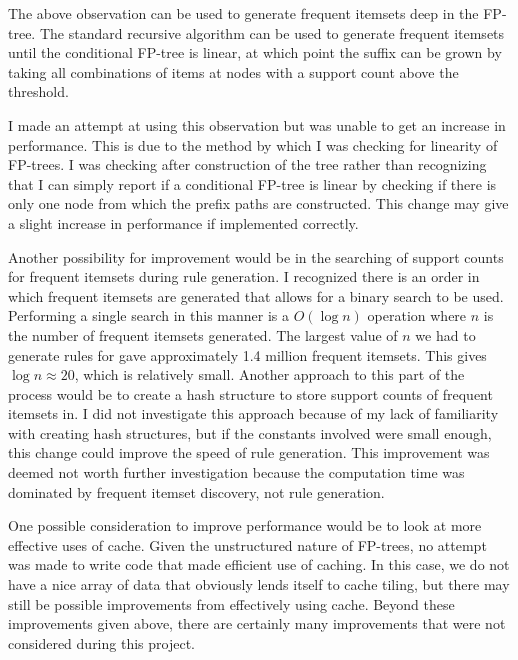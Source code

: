 \documentclass[11pt]{article}
\begin{document}
The above observation can be used to generate frequent itemsets deep in the FP-tree. The standard recursive algorithm can be used to generate frequent
itemsets until the conditional FP-tree is linear, at which point the suffix can be grown by taking all combinations of items at nodes with a support
count above the threshold.

I made an attempt at using this observation but was unable to get an increase in performance. This is due to the method by which I was checking for
linearity of FP-trees. I was checking after construction of the tree rather than recognizing that I can simply report if a conditional FP-tree is
linear by checking if there is only one node from which the prefix paths are constructed. This change may give a slight increase in performance if
implemented correctly.

Another possibility for improvement would be in the searching of support counts for frequent itemsets during rule generation. I recognized there is an
order in which frequent itemsets are generated that allows for a binary search to be used. Performing a single search in this manner is a $O(\log n)$
operation where $n$ is the number of frequent itemsets generated. The largest value of $n$ we had to generate rules for gave approximately 1.4 million
frequent itemsets. This gives $\log n \approx 20$, which is relatively small. Another approach to this part of the process would be to create a hash
structure to store support counts of frequent itemsets in. I did not investigate this approach because of my lack of familiarity with creating hash
structures, but if the constants involved were small enough, this change could improve the speed of rule generation. This improvement was deemed not
worth further investigation because the computation time was dominated by frequent itemset discovery, not rule generation.

One possible consideration to improve performance would be to look at more effective uses of cache. Given the unstructured
nature of FP-trees, no attempt was made to write code that made efficient use of caching. In this case, we do not have a nice array of data that
obviously lends itself to cache tiling, but there may still be possible improvements from effectively using cache. Beyond these improvements given
above, there are certainly many improvements that were not considered during this project.
\end{document}
